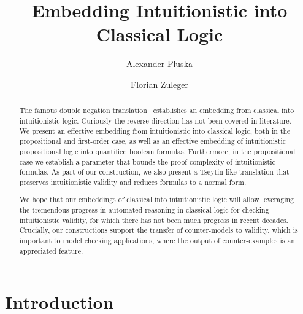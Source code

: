 \documentclass[runningheads]{llncs}
\begin{document}
	\title{Embedding Intuitionistic into Classical Logic}
	\author{Alexander Pluska \and
		Florian Zuleger}
	\maketitle
\begin{abstract}
The famous double negation translation~\cite{glivenko1929quelques,godel1933intuitionistischen} establishes an embedding from classical into intuitionistic logic. Curiously the reverse direction has not been covered in literature. We present an effective embedding from intuitionistic into classical logic, both in the propositional and first-order case, as well as an effective embedding of intuitionistic propositional logic into quantified boolean formulas.
Furthermore, in the propositional case we establish a parameter that bounds the proof complexity of intuitionistic formulas. As part of our construction, we also present a Tseytin-like translation that preserves intuitionistic validity and reduces formulas to a normal form.



We hope that our embeddings of classical into intuitionistic logic will allow leveraging the tremendous progress in automated reasoning in classical logic for checking intuitionistic validity, for which there has not been much progress in recent decades. Crucially, our constructions support the transfer of counter-models to validity, which is important to model checking applications, where the output of counter-examples is an appreciated feature.
\end{abstract}

\section{Introduction}
\end{document}

